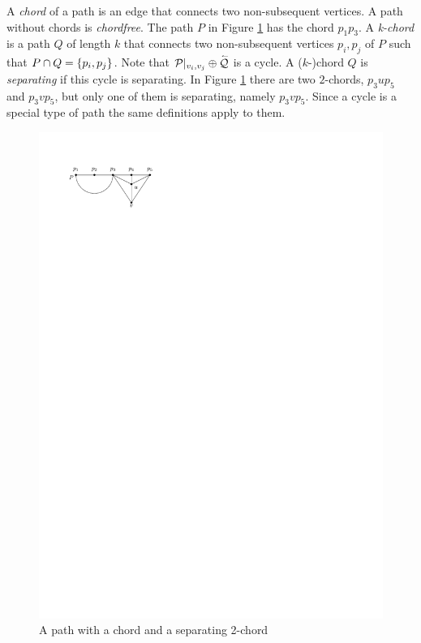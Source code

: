     A \emph{chord} of a path is an edge that connects two non-subsequent vertices. A path without chords is \emph{chordfree}. The path $P$ in Figure \ref{fig:right:chord} has the chord $p_1 p_3$.
    A \emph{k-chord} is a path $Q$ of length $k$ that connects two non-subsequent vertices $p_i, p_j$ of $P$ such that $P \cap Q = \left\lbrace {p_i, p_j} \right\rbrace$.
    Note that $\mathcal{P}|_{v_i, v_j} \oplus \accentset{\leftharpoonup}{\mathcal{Q}}$ is a cycle.
    A ($k$-)chord $Q$ is \emph{separating} if this cycle is separating. In Figure \ref{fig:right:chord} there are two $2$-chords, $p_3 u p_5$ and $p_3 v p_5$, but only one of them is separating, namely $p_3 v p_5$.
    Since a cycle is a special type of path the same definitions apply to them.

  \begin{figure}[h]
    \centering
    \includegraphics[scale=1]{unifiedAlgo/img/rightNeighbourwalk/chords.pdf}
    \caption{A path with a chord and a separating 2-chord}
    \label{fig:right:chord}
  \end{figure}

